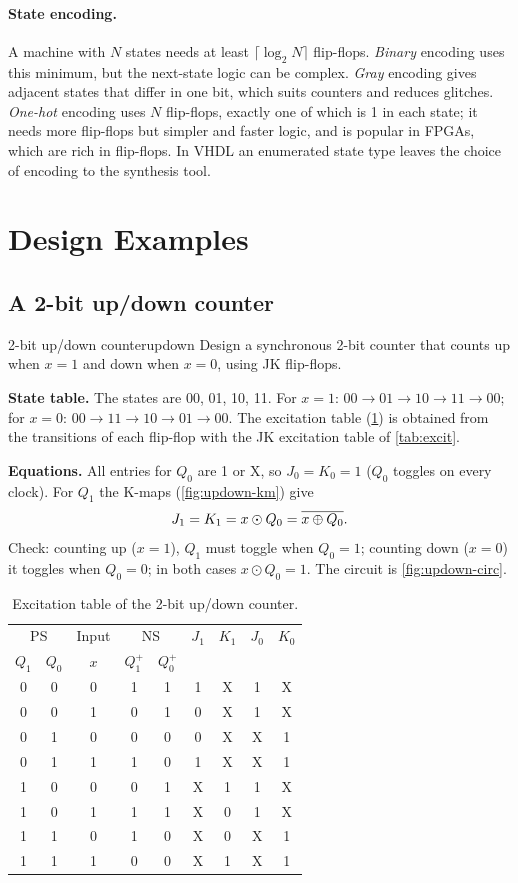 \paragraph{State encoding.} A machine with $N$ states needs at least $\lceil\log_2N\rceil$ flip-flops. \emph{Binary} encoding uses this minimum, but the next-state logic can be complex. \emph{Gray} encoding gives adjacent states that differ in one bit, which suits counters and reduces glitches. \emph{One-hot} encoding uses $N$ flip-flops, exactly one of which is 1 in each state; it needs more flip-flops but simpler and faster logic, and is popular in FPGAs, which are rich in flip-flops. In VHDL an enumerated state type leaves the choice of encoding to the synthesis tool.

\section{Design Examples}\label{sec:fsm-examples}

\subsection{A 2-bit up/down counter}
\begin{example}{2-bit up/down counter}{updown}
Design a synchronous 2-bit counter that counts up when $x=1$ and down when $x=0$, using JK flip-flops.

\textbf{State table.} The states are 00, 01, 10, 11. For $x=1$: $00\to01\to10\to11\to00$; for $x=0$: $00\to11\to10\to01\to00$. The excitation table (\cref{tab:updown}) is obtained from the transitions of each flip-flop with the JK excitation table of \cref{tab:excit}.

\textbf{Equations.} All entries for $Q_0$ are 1 or X, so $J_0=K_0=1$ ($Q_0$ toggles on every clock). For $Q_1$ the K-maps (\cref{fig:updown-km}) give
\[
 J_1 = K_1 = x\odot Q_0 = \overline{x\oplus Q_0}.
\]
Check: counting up ($x=1$), $Q_1$ must toggle when $Q_0=1$; counting down ($x=0$) it toggles when $Q_0=0$; in both cases $x\odot Q_0=1$. The circuit is \cref{fig:updown-circ}.
\end{example}

\begin{table}[htbp]
\centering
\small
\caption{Excitation table of the 2-bit up/down counter.}
\label{tab:updown}
\begin{tabular}{cc|c|cc|cccc}
\toprule
\multicolumn{2}{c|}{PS} & Input & \multicolumn{2}{c|}{NS} & $J_1$&$K_1$&$J_0$&$K_0$\\
$Q_1$&$Q_0$&$x$&$Q_1^+$&$Q_0^+$&&&&\\ \midrule
0&0&0&1&1&1&X&1&X\\0&0&1&0&1&0&X&1&X\\
0&1&0&0&0&0&X&X&1\\0&1&1&1&0&1&X&X&1\\
1&0&0&0&1&X&1&1&X\\1&0&1&1&1&X&0&1&X\\
1&1&0&1&0&X&0&X&1\\1&1&1&0&0&X&1&X&1\\ \bottomrule
\end{tabular}
\end{table}

